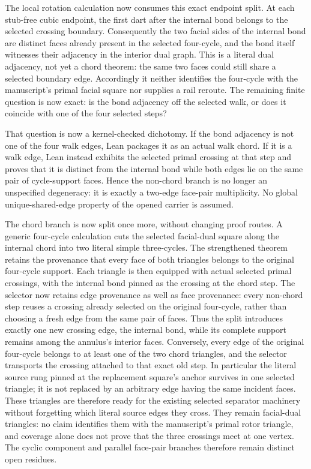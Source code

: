 \documentclass[11pt]{article}
\theoremstyle{definition}
\begin{document}
The local rotation calculation now consumes this exact endpoint split.  At
each stub-free cubic endpoint, the first dart after the internal bond belongs
to the selected crossing boundary.  Consequently the two facial sides of the
internal bond are distinct faces already present in the selected four-cycle,
and the bond itself witnesses their adjacency in the interior dual graph.
This is a literal dual adjacency, not yet a chord theorem: the same two faces
could still share a selected boundary edge.  Accordingly it neither identifies
the four-cycle with the manuscript's primal facial square nor supplies a rail
reroute.  The remaining finite question is now exact: is the bond adjacency
off the selected walk, or does it coincide with one of the four selected
steps?

That question is now a kernel-checked dichotomy.  If the bond adjacency is not
one of the four walk edges, Lean packages it as an actual walk chord.  If it is
a walk edge, Lean instead exhibits the selected primal crossing at that step
and proves that it is distinct from the internal bond while both edges lie on
the same pair of cycle-support faces.  Hence the non-chord branch is no longer
an unspecified degeneracy: it is exactly a two-edge face-pair multiplicity.
No global unique-shared-edge property of the opened carrier is assumed.

The chord branch is now split once more, without changing proof routes.  A
generic four-cycle calculation cuts the selected facial-dual square along the
internal chord into two literal simple three-cycles.  The strengthened theorem
retains the provenance that every face of both triangles belongs to the
original four-cycle support.  Each triangle is then equipped with actual
selected primal crossings, with the internal bond pinned as the crossing at
the chord step.  The selector now retains edge provenance as well as face
provenance: every non-chord step reuses a crossing already selected on the
original four-cycle, rather than choosing a fresh edge from the same pair of
faces.  Thus the split introduces exactly one new crossing edge, the internal
bond, while its complete support remains among the annulus's interior faces.
Conversely, every edge of the original four-cycle belongs to at least one of
the two chord triangles, and the selector transports the crossing attached to
that exact old step.  In particular the literal source rung pinned at the
replacement square's anchor survives in one selected triangle; it is not
replaced by an arbitrary edge having the same incident faces.
These triangles are therefore ready for the existing selected separator
machinery without forgetting which literal source edges they cross.  They
remain facial-dual triangles: no claim identifies them with the manuscript's
primal rotor triangle, and coverage alone does not prove that the three
crossings meet at one vertex.  The cyclic component and parallel face-pair
branches therefore remain distinct open residues.
\end{document}
